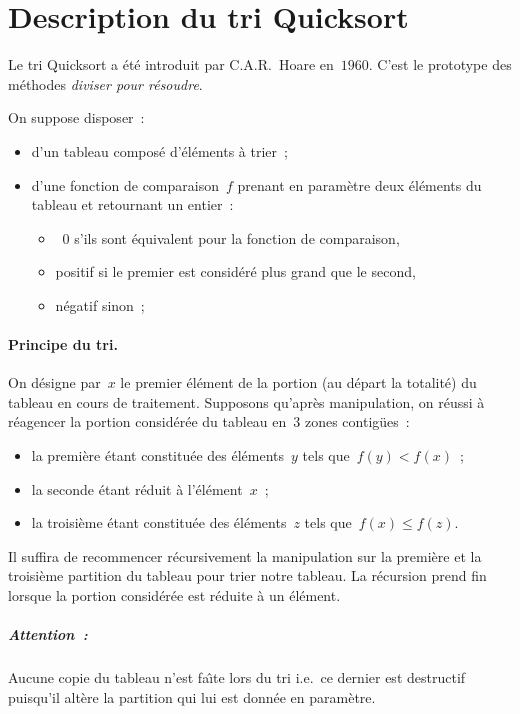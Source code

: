 \documentclass{article}
\begin{document}
\section{Description du tri Quicksort}
Le tri Quicksort a \'et\'e introduit par C.A.R.~Hoare en~$1960$.
C'est le prototype des m\'ethodes \emph{diviser pour r\'esoudre}.

On suppose disposer~:
\begin{itemize}
\item d'un tableau compos\'e d'\'el\'ements \`a trier~;
\item d'une fonction de comparaison~$f$ prenant en param\`etre deux
  \'el\'ements du tableau et retournant un entier~:
  \begin{itemize}
  \item~$0$ s'ils sont \'equivalent pour la fonction de comparaison,
  \item positif si le premier est consid\'er\'e plus grand que le second,
  \item n\'egatif sinon~;
  \end{itemize}
\end{itemize}
\paragraph{Principe du tri.}
On d\'esigne par~$x$ le premier \'el\'ement de la portion (au d\'epart
la totalit\'e) du tableau en cours de traitement.  Supposons
qu'apr\`es manipulation, on r\'eussi \`a r\'eagencer la portion
consid\'er\'ee du tableau en~$3$ zones contig\"ues~:
\begin{itemize}
\item la premi\`ere \'etant constitu\'ee des \'el\'ements~$y$ tels
  que~${f(y)< f(x)}$~;
\item la seconde  \'etant r\'eduit \`a l'\'el\'ement~$x$~;
\item la troisi\`eme \'etant constitu\'ee des \'el\'ements~$z$ tels que~${f(x)\leq f(z)}$.
\end{itemize}
Il suffira de recommencer r\'ecursivement la manipulation sur la
premi\`ere et la troisi\`eme partition du tableau pour trier notre
tableau. La r\'ecursion prend fin lorsque  la
portion consid\'er\'ee est r\'eduite \`a un \'el\'ement.

\subparagraph{Attention~:}

Aucune copie du tableau n'est fa\^\i{}te lors du tri i.e.\ ce dernier
est destructif puisqu'il alt\`ere la partition qui lui est donn\'ee en
param\`etre.
\end{document}

